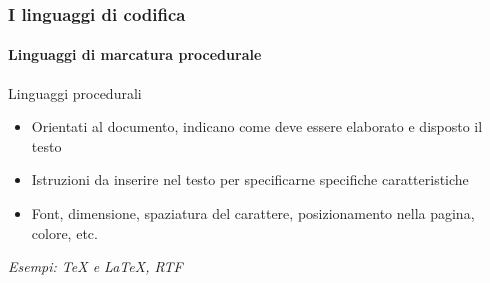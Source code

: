 \documentclass{beamer}
\begin{document}
\begin{frame}
	\frametitle{I linguaggi di codifica}
	\framesubtitle{Linguaggi di marcatura procedurale}
	\addtocounter{nframe}{1}

	\begin{block}{Linguaggi procedurali}
		\begin{itemize}
			\item Orientati al documento, indicano come deve essere elaborato e
			      disposto il testo
			\item Istruzioni da inserire nel testo per specificarne specifiche
			      caratteristiche
			\item Font, dimensione, spaziatura del carattere, posizionamento
			      nella pagina, colore, etc.
		\end{itemize}
	\end{block}

	\textit{Esempi: TeX e LaTeX, RTF}

\end{frame}

\begin{frame}[fragile]
	\frametitle{I linguaggi di codifica}
	\framesubtitle{Linguaggi di marcatura procedurale}
	\addtocounter{nframe}{1}

	\defverbatim{\rtf}{%
		\begin{tiny}
			\begin{verbatim}

    {\rtf1\ansi\deff0\adeflang1025
    {\fonttbl{\f0\froman\fprq2\fcharset0 Times New Roman;}
    {\f1\froman\fprq2\fcharset0 Times New Roman;}
    {\f2\fnil\fprq2\fcharset0 Lucida Sans Unicode;}
    {\colortbl;\red0\green0\blue0;\red128\green128\blue128;}
    {\stylesheet{\s1\cf0{\*\hyphen2\hyphlead2\hyphtrail2\hyphmax0}
    \rtlch\af5\afs24\lang255\ltrch\dbch\af2\afs24\langfe255
    \loch\f0\fs24\lang1040\snext1 Standard;}

        \end{verbatim}
		\end{tiny}
	}

	\begin{block}{Esempio RTF}
		{\rtf}
	\end{block}

\end{frame}
\end{document}

